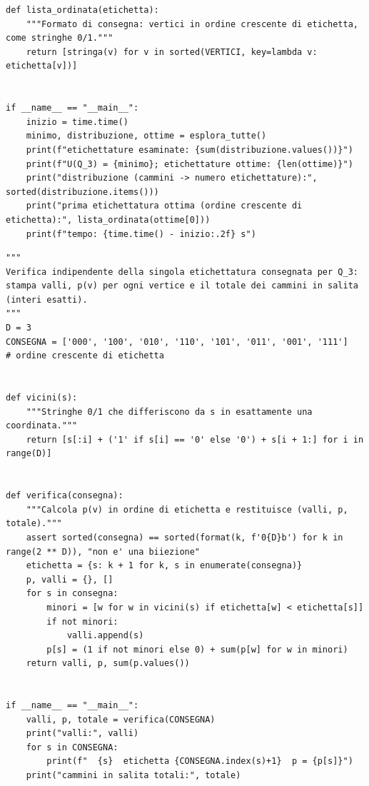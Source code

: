 \documentclass[11pt,a4paper]{article}
\begin{document}
\begin{lstlisting}[caption={attempt\_001 code\_1 [python, rigore exact] — Exhaustive exact enumeration of all 8! = 40320 labellings of Q\_3; two independent counts ( — verdetto del Referee: (nessun verdetto)}]
def lista_ordinata(etichetta):
    """Formato di consegna: vertici in ordine crescente di etichetta, come stringhe 0/1."""
    return [stringa(v) for v in sorted(VERTICI, key=lambda v: etichetta[v])]


if __name__ == "__main__":
    inizio = time.time()
    minimo, distribuzione, ottime = esplora_tutte()
    print(f"etichettature esaminate: {sum(distribuzione.values())}")
    print(f"U(Q_3) = {minimo}; etichettature ottime: {len(ottime)}")
    print("distribuzione (cammini -> numero etichettature):", sorted(distribuzione.items()))
    print("prima etichettatura ottima (ordine crescente di etichetta):", lista_ordinata(ottime[0]))
    print(f"tempo: {time.time() - inizio:.2f} s")

\end{lstlisting}
\begin{lstlisting}[caption={attempt\_001 code\_2 [python, rigore exact] — Independent check of the single submitted labelling (bijection check, valleys, per-vertex  — verdetto del Referee: (nessun verdetto)}]
"""
Verifica indipendente della singola etichettatura consegnata per Q_3:
stampa valli, p(v) per ogni vertice e il totale dei cammini in salita (interi esatti).
"""
D = 3
CONSEGNA = ['000', '100', '010', '110', '101', '011', '001', '111']   # ordine crescente di etichetta


def vicini(s):
    """Stringhe 0/1 che differiscono da s in esattamente una coordinata."""
    return [s[:i] + ('1' if s[i] == '0' else '0') + s[i + 1:] for i in range(D)]


def verifica(consegna):
    """Calcola p(v) in ordine di etichetta e restituisce (valli, p, totale)."""
    assert sorted(consegna) == sorted(format(k, f'0{D}b') for k in range(2 ** D)), "non e' una biiezione"
    etichetta = {s: k + 1 for k, s in enumerate(consegna)}
    p, valli = {}, []
    for s in consegna:
        minori = [w for w in vicini(s) if etichetta[w] < etichetta[s]]
        if not minori:
            valli.append(s)
        p[s] = (1 if not minori else 0) + sum(p[w] for w in minori)
    return valli, p, sum(p.values())


if __name__ == "__main__":
    valli, p, totale = verifica(CONSEGNA)
    print("valli:", valli)
    for s in CONSEGNA:
        print(f"  {s}  etichetta {CONSEGNA.index(s)+1}  p = {p[s]}")
    print("cammini in salita totali:", totale)

\end{lstlisting}
\end{document}
